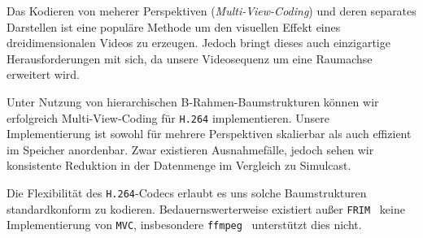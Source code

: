 \noindent\newline Das Kodieren von meherer Perspektiven (\textit{Multi-View-Coding}) und deren separates Darstellen ist
eine popul\"are Methode um den visuellen Effekt eines dreidimensionalen Videos zu erzeugen.
Jedoch bringt dieses auch einzigartige Herausforderungen mit sich, da unsere Videosequenz um eine Raumachse erweitert
wird.

\noindent\newline Unter Nutzung von hierarchischen B-Rahmen-Baumstrukturen k\"onnen wir erfolgreich Multi-View-Coding
f\"ur \texttt{H.264} implementieren.
Unsere Implementierung ist sowohl f\"ur mehrere Perspektiven skalierbar als auch effizient im Speicher
anordenbar.
Zwar existieren Ausnahmef\"alle, jedoch sehen wir konsistente Reduktion in der Datenmenge im Vergleich
zu Simulcast.

\noindent\newline Die Flexibilit\"at des \texttt{H.264}-Codecs erlaubt es uns solche Baumstrukturen standardkonform
zu kodieren.
Bedauernswerterweise existiert au{\ss}er \texttt{FRIM}~\cite{frim} keine Implementierung von \texttt{MVC}, insbesondere
\texttt{ffmpeg}~\cite{ffmpeg} unterst\"utzt dies nicht.





